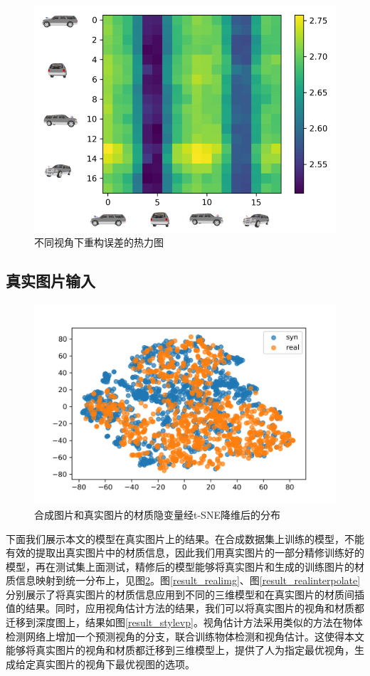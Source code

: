 \documentclass[UTF8,openany,AutoFakeBold,AutoFakeSlant,cs4size]{ctexbook}
\begin{document}
\begin{figure}
\centering
\includegraphics[width=\linewidth]{./images/vsmat_thesis.png}
\caption{不同视角下重构误差的热力图}
\label{result_heatmap}
\end{figure}

\subsection{真实图片输入}

\begin{figure}
\centering
\includegraphics[width=0.8\linewidth]{./images/syn_real_dist_thesis.png}
\caption{合成图片和真实图片的材质隐变量经t-SNE降维后的分布}
\label{result_dist}
\end{figure}

下面我们展示本文的模型在真实图片上的结果。在合成数据集上训练的模型，不能有效的提取出真实图片中的材质信息，因此我们用真实图片的一部分精修训练好的模型，再在测试集上面测试，精修后的模型能够将真实图片和生成的训练图片的材质信息映射到统一分布上，见图\ref{result_dist}。图\ref{result_realimg}、图\ref{result_realinterpolate}分别展示了将真实图片的材质信息应用到不同的三维模型和在真实图片的材质间插值的结果。同时，应用视角估计方法的结果，我们可以将真实图片的视角和材质都迁移到深度图上，结果如图\ref{result_stylevp}。视角估计方法采用类似\cite{Massa2016CraftingAM}的方法在物体检测网络上增加一个预测视角的分支，联合训练物体检测和视角估计。这使得本文能够将真实图片的视角和材质都迁移到三维模型上，提供了人为指定最优视角，生成给定真实图片的视角下最优视图的选项。
\end{document}
